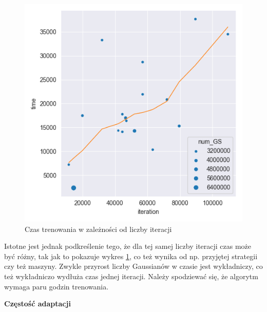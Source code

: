 \begin{figure}[!h]
    \centering
    \includegraphics[width=0.6\linewidth]{img/gs_metrics/time_iteration.png}
    \caption{Czas trenowania w zależności od liczby iteracji}
    \label{fig:metrics_4}
\end{figure}

Istotne jest jednak podkreślenie tego, że dla tej samej liczby iteracji czas może być różny, tak jak to pokazuje wykres \ref{fig:metrics_4}, co też wynika od np. przyjętej strategii czy też maszyny. Zwykle przyrost liczby Gaussianów w czasie jest wykładniczy, co też wykładniczo wydłuża czas jednej iteracji. Należy spodziewać się, że algorytm wymaga paru godzin trenowania. 

\textbf{Częstość adaptacji}


